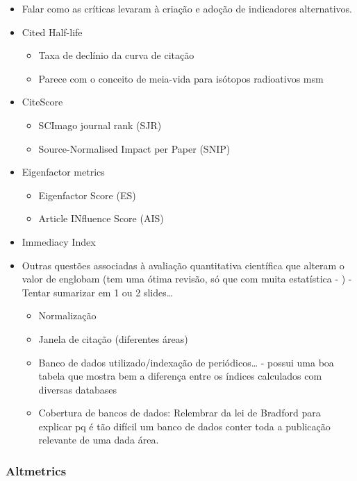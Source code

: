 \documentclass[11pt]{article}
\begin{document}
\begin{itemize}
\begin{itemize}
\begin{itemize}
\begin{itemize}
\item Falar como as críticas levaram à criação e adoção de indicadores alternativos.
\item Cited Half-life
\begin{itemize}
\item Taxa de declínio da curva de citação
\item Parece com o conceito de meia-vida para isótopos radioativos msm
\end{itemize}
\item CiteScore
\begin{itemize}
\item SCImago journal rank (SJR)
\item Source-Normalised Impact per Paper (SNIP)
\end{itemize}
\item Eigenfactor metrics
\begin{itemize}
\item Eigenfactor Score (ES)
\item Article INfluence Score (AIS)
\end{itemize}
\item Immediacy Index

\item Outras questões associadas à avaliação quantitativa científica que alteram o valor de  englobam (tem uma ótima revisão, só que com muita estatística - \cite{waltman2016} ) - Tentar sumarizar em 1 ou 2 slides\ldots{}
\begin{itemize}
\item Normalização
\item Janela de citação (diferentes áreas)
\item Banco de dados utilizado/indexação de periódicos\ldots{} - \cite{garner2018} possui uma boa tabela que mostra bem a diferença entre os índices calculados com diversas databases
\item Cobertura de bancos de dados: Relembrar da lei de Bradford para explicar pq é tão difícil um banco de dados conter toda a publicação relevante de uma dada área.
\end{itemize}
\end{itemize}
\end{itemize}
\end{itemize}
\end{itemize}
\subsubsection{Altmetrics}
\label{sec:org1defc99}
\end{document}
